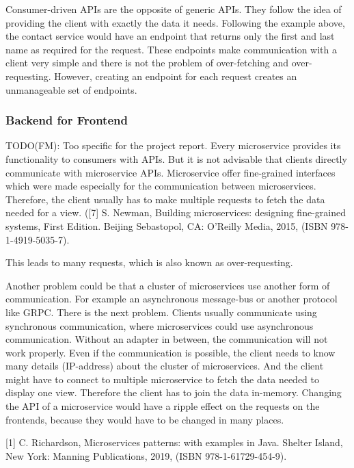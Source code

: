 Consumer-driven APIs are the opposite of generic APIs. They follow the idea of providing the client with exactly the data it needs. Following the example above, the contact service would have an endpoint that returns only the first and last name as required for the request. These endpoints make communication with a client very simple and there is not the problem of over-fetching and over-requesting. However, creating an endpoint for each request creates an unmanageable set of endpoints. \cite{misc:2019:leitner:backend-for-frontends}

\subsubsection{Backend for Frontend}

\ifshowUnusedContent
TODO(FM): Too specific for the project report.
Every microservice provides its functionality to consumers with APIs. But it is not advisable that clients directly communicate with microservice APIs. Microservice offer fine-grained interfaces which were made especially for the communication between microservices. Therefore, the client usually has to make multiple requests to fetch the data needed for a view. ([7] S. Newman, Building microservices: designing fine-grained systems, First Edition. Beijing Sebastopol, CA: O’Reilly Media, 2015, (ISBN 978-1-4919-5035-7).

This leads to many requests, which is also known as over-requesting.

Another problem could be that a cluster of microservices use another form of communication. For example an asynchronous message-bus or another protocol like GRPC. There is the next problem. Clients usually communicate using synchronous communication, where microservices could use asynchronous communication. Without an adapter in between, the communication will not work properly. Even if the communication is possible, the client needs to know many details (IP-address) about the cluster of microservices. And the client might have to connect to multiple microservice to fetch the data needed to display one view. Therefore the client has to join the data in-memory. Changing the API of a microservice would have a ripple effect on the requests on the frontends, because they would have to be changed in many places.

[1] C. Richardson, Microservices patterns: with examples in Java. Shelter Island, New York: Manning Publications, 2019, (ISBN 978-1-61729-454-9).

